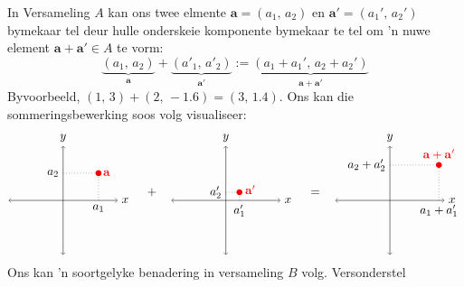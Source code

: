 \documentclass[a4paper,11pt]{book}
\theoremstyle{definition}
\newcommand{\be}{\begin{equation}}
\newcommand{\ee}{\end{equation}}
\newcommand{\ve}[1]{\mathbf{#1}}
\begin{document}
In Versameling $A$ kan ons twee elmente $\ve{a} = (a_1, \, a_2)$ en
$\ve{a}'= (a_1', \, a_2')$ bymekaar tel deur hulle onderskeie komponente
bymekaar te tel om 'n nuwe element $\ve{a} + \ve{a}' \in A$ te vorm:
\be \label{add_in_A}
\underbrace{(a_1, \, a_2)}_{\ve{a}} + \underbrace{(a'_1, \,a'_2)}_{\ve{a}'}
:= \underbrace{(a_1 + a_1', \, a_2 + a_2')}_{\ve{a} + \ve{a}'}
\ee
Byvoorbeeld, $(1, \,3) + (2, \,-1.6) = (3, \,1.4)$. Ons kan die
sommeringsbewerking soos volg visualiseer:
\begin{align*}
\begin{tikzpicture}[baseline={([yshift=-.5ex]current bounding box.center)},vertex/.style={anchor=base,
	circle,fill=black!25,minimum size=18pt,inner sep=2pt}, scale=0.8]
\draw[<->] (-2, 0) -- (2,0) node[right] {$x$};
\draw[<->] (0, -2) -- (0, 2) node[above] {$y$};
\node [circle, fill=black, inner sep=0pt, minimum size=5pt, color=red] (P) at (1.3, 1) {};
\draw[dotted] (1.3, 0) node[below] {$a_1$} -- (1.3, 1);
\draw[dotted] (0, 1) node[left] {$a_2$} -- (1.3, 1);
\node[color=red] at (1.6,1) {$\ve{a}$};
\end{tikzpicture}
\quad + \quad
\begin{tikzpicture}[baseline={([yshift=-.5ex]current bounding box.center)},vertex/.style={anchor=base,
	circle,fill=black!25,minimum size=18pt,inner sep=2pt}, scale=0.8]
\draw[<->] (-2, 0) -- (2,0) node[right] {$x$};
\draw[<->] (0, -2) -- (0, 2) node[above] {$y$};
\node [circle, fill=black, inner sep=0pt, minimum size=5pt, color=red] (P) at (0.5, 0.3) {};
\draw[dotted] (0.5, 0) node[below] {$a'_1$} -- (0.5, 0.3);
\draw[dotted] (0, 0.3) node[left] {$a'_2$} -- (0.5, 0.3);
\node[color=red] at (0.9,0.4) {$\ve{a}'$};
\end{tikzpicture}
\quad = \quad
\begin{tikzpicture}[baseline={([yshift=-.5ex]current bounding box.center)},vertex/.style={anchor=base,
	circle,fill=black!25,minimum size=18pt,inner sep=2pt}, scale=0.8]
\draw[<->] (-2, 0) -- (2,0) node[right] {$x$};
\draw[<->] (0, -2) -- (0, 2) node[above] {$y$};
\node [circle, fill=black, inner sep=0pt, minimum size=5pt, color=red] (P) at (1.8, 1.3) {};
\draw[dotted] (1.8, 0) node[below] {$a_1+ a'_1$} -- (1.8, 1.3);
\draw[dotted] (0, 1.3) node[left] {$a_2 + a'_2$} -- (1.8, 1.3);
\node[color=red] at (1.8,1.7) {$\ve{a} + \ve{a}'$};
\end{tikzpicture}
\end{align*}
Ons kan 'n soortgelyke benadering in versameling $B$ volg. Versonderstel
\end{document}
